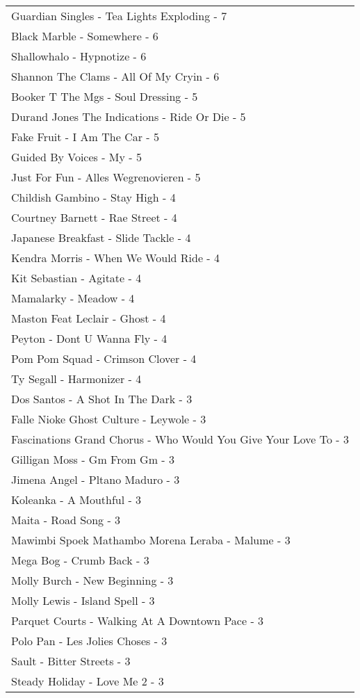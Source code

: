 \documentclass[
]{article}
\begin{document}
\begin{longtable}{l}
\midrule
Guardian Singles - Tea Lights Exploding - 7 \\ 
Black Marble - Somewhere - 6 \\ 
Shallowhalo - Hypnotize - 6 \\ 
Shannon The Clams - All Of My Cryin - 6 \\ 
Booker T The Mgs - Soul Dressing - 5 \\ 
Durand Jones The Indications - Ride Or Die - 5 \\ 
Fake Fruit - I Am The Car - 5 \\ 
Guided By Voices - My - 5 \\ 
Just For Fun - Alles Wegrenovieren - 5 \\ 
Childish Gambino - Stay High - 4 \\ 
Courtney Barnett - Rae Street - 4 \\ 
Japanese Breakfast - Slide Tackle - 4 \\ 
Kendra Morris - When We Would Ride - 4 \\ 
Kit Sebastian - Agitate - 4 \\ 
Mamalarky - Meadow - 4 \\ 
Maston Feat Leclair - Ghost - 4 \\ 
Peyton - Dont U Wanna Fly - 4 \\ 
Pom Pom Squad - Crimson Clover - 4 \\ 
Ty Segall - Harmonizer - 4 \\ 
Dos Santos - A Shot In The Dark - 3 \\ 
Falle Nioke Ghost Culture - Leywole - 3 \\ 
Fascinations Grand Chorus - Who Would You Give Your Love To - 3 \\ 
Gilligan Moss - Gm From Gm - 3 \\ 
Jimena Angel - Pltano Maduro - 3 \\ 
Koleanka - A Mouthful - 3 \\ 
Maita - Road Song - 3 \\ 
Mawimbi Spoek Mathambo Morena Leraba - Malume - 3 \\ 
Mega Bog - Crumb Back - 3 \\ 
Molly Burch - New Beginning - 3 \\ 
Molly Lewis - Island Spell - 3 \\ 
Parquet Courts - Walking At A Downtown Pace - 3 \\ 
Polo Pan - Les Jolies Choses - 3 \\ 
Sault - Bitter Streets - 3 \\ 
Steady Holiday - Love Me 2 - 3 \\ 

\end{longtable}
\end{document}
